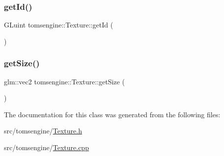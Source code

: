 \subsubsection{\texorpdfstring{get\+Id()}{getId()}}
{\footnotesize\ttfamily G\+Luint tomsengine\+::\+Texture\+::get\+Id (\begin{DoxyParamCaption}{ }\end{DoxyParamCaption})}

\mbox{\label{classtomsengine_1_1_texture_a270a5d664501ca0e7843a737508dbba5}} 
\subsubsection{\texorpdfstring{get\+Size()}{getSize()}}
{\footnotesize\ttfamily glm\+::vec2 tomsengine\+::\+Texture\+::get\+Size (\begin{DoxyParamCaption}{ }\end{DoxyParamCaption})}



The documentation for this class was generated from the following files\+:\begin{DoxyCompactItemize}
\item 
src/tomsengine/\mbox{\hyperlink{_texture_8h}{Texture.\+h}}\item 
src/tomsengine/\mbox{\hyperlink{_texture_8cpp}{Texture.\+cpp}}\end{DoxyCompactItemize}

